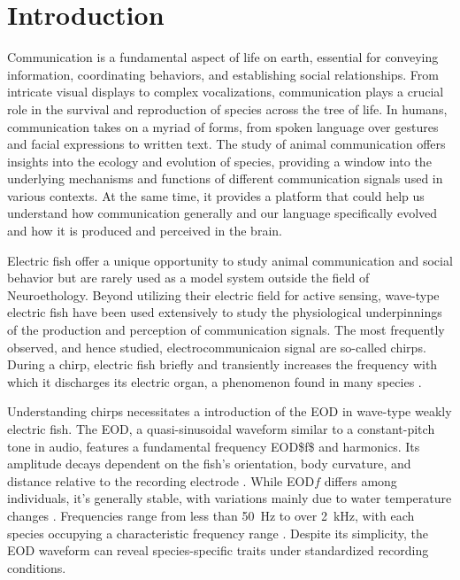 \chapter{Introduction}
\label{chap:intro}

Communication is a fundamental aspect of life on earth, essential for conveying
information, coordinating behaviors, and establishing social relationships.
From intricate visual displays to complex vocalizations, communication plays a
crucial role in the survival and reproduction of species across the tree of
life. In humans, communication takes on a myriad of forms, from spoken language
over gestures and facial expressions to written text. The study of animal
communication offers insights into the ecology and evolution of
species, providing a window into the underlying mechanisms and functions of
different communication signals used in various contexts. At the same time, it
provides a platform that could help us understand how communication generally
and our language specifically evolved and how it is produced and perceived in
the brain.

\ornament

Electric fish offer a unique opportunity to study animal communication and
social behavior but are rarely used as a model system outside the field of
Neuroethology. Beyond utilizing their electric field for active sensing,
wave-type electric fish have been used extensively to study the physiological
underpinnings of the production and perception of communication signals. The
most frequently observed, and hence studied, electrocommunicaion signal are
so-called chirps. During a chirp, electric fish briefly and transiently
increases the frequency with which it discharges its electric organ, a
phenomenon found in many species
\parencite{petzoldCoadaptationElectricOrgan2016,
smithEvolutionElectricCommunication2016,
freilerElectrocommunicationSignalsAggressive2022,
zhouStructureSexualDimorphism2006, hoSexDifferencesElectrocommunication2010}.

Understanding chirps necessitates a introduction of the \acrfull{EOD} in
wave-type weakly electric fish. The EOD, a quasi-sinusoidal waveform similar to
a constant-pitch tone in audio, features a fundamental frequency
\acrshort{EOD$f$} and harmonics. Its amplitude decays dependent on the fish's
orientation, body curvature, and distance relative to the recording electrode
\parencite{bendaPhysicsElectrosensoryWorlds2020}. While EOD$f$ differs among
individuals, it's generally stable, with variations mainly due to water
temperature changes \parencite{moortgatSubmicrosecondPacemakerPrecision1998}.
Frequencies range from less than \SI{50}{\hertz} to over \SI{2}{\kilo\hertz},
with each species occupying a characteristic frequency range
\parencite{bendaPhysicsElectrosensoryWorlds2020,
evansTaxonomicRevisionDeep2017a}. Despite its simplicity, the EOD waveform can
reveal species-specific traits under standardized recording conditions.


